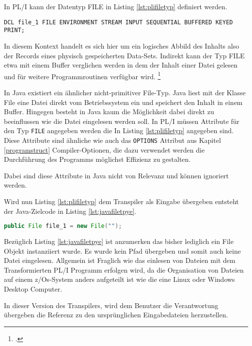 In PL/I kann der Datentyp FILE in Listing \ref{lst:plifiletyp} definiert werden.

\begin{lstlisting}[language=PL/I, caption=FILE Typ in PL/I, label={lst:plifiletyp}]
DCL file_1 FILE ENVIRONMENT STREAM INPUT SEQUENTIAL BUFFERED KEYED PRINT;
\end{lstlisting} 

In diesem Kontext handelt es sich hier um ein logisches Abbild des Inhalts also der Records eines physisch gespeicherten Data-Sets.
Indirekt kann der Typ FILE etwa mit einem Buffer verglichen werden in dem der Inhalt einer Datei gelesen und für weitere Programmroutinen verfügbar wird.
\footcite[Vgl. ][ S.305ff. ]{pliref}

In Java existiert ein ähnlicher nicht-primitiver File-Typ.
Java liest mit der Klasse File eine Datei direkt vom Betriebssystem ein und speichert den Inhalt in einem Buffer. 
Hingegen besteht in Java kaum die Möglichkeit dabei direkt zu beeinflussen wie die Datei eingelesen werden soll. 
In PL/I müssen Attribute für den Typ \verb+FILE+ angegeben werden die 
In Listing \ref{lst:plifiletyp} angegeben sind. 
Diese Attribute sind ähnliche wie auch das \verb+OPTIONS+ Attribut aus Kapitel \ref{programstruct} Compiler-Optionen, die dazu verwendet werden die Durchführung des Programms möglichst Effizienz zu gestalten.

Dabei sind diese Attribute in Java nicht von Relevanz und können ignoriert werden.

Wird nun Listing \ref{lst:plifiletyp} dem Transpiler als Eingabe übergeben entsteht der Java-Zielcode in Listing \ref{lst:javafiletpye}.

\begin{lstlisting}[language=Java, caption=File Objekt in Java, label={lst:javafiletpye}]
public File file_1 = new File("");
\end{lstlisting} 

Bezüglich Listing \ref{lst:javafiletpye} ist anzumerken das bisher lediglich ein File Objekt instanziiert wurde.
Es wurde kein Pfad übergeben und somit auch keine Datei eingelesen.
Allgemein ist Fraglich wie das einlesen von Dateien mit dem Transformierten PL/I Programm erfolgen wird, da die Organisation von Dateien auf einem z/Os-System anders aufgeteilt ist wie die eine Linux oder Windows Desktop Computer.

In dieser Version des Transpilers, wird dem Benutzer die Verantwortung übergeben die Referenz zu den ursprünglichen Eingabedateien herzustellen.

